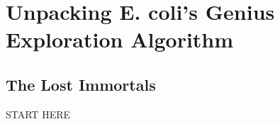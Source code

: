 \chapter[Unpacking E. coli’s Genius Exploration Algorithm]{Unpacking E. coli’s Genius Exploration Algorithm}
\label{chapter:chemotaxis}
\renewcommand{\chaptertitle}{Unpacking E. coli’s Genius Exploration Algorithm}


\FloatBarrier

\section{The Lost Immortals}
\label{sec:introduction}

START HERE